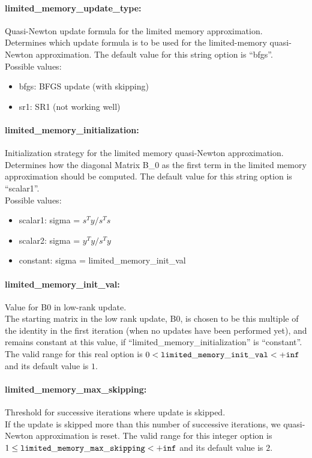 \paragraph{limited\_memory\_update\_type:} Quasi-Newton update formula for the limited memory approximation. $\;$ \\
 Determines which update formula is to be used for
the limited-memory quasi-Newton approximation.
The default value for this string option is ``bfgs''.
\\ 
Possible values:
\begin{itemize}
   \item bfgs: BFGS update (with skipping)
   \item sr1: SR1 (not working well)
\end{itemize}

\paragraph{limited\_memory\_initialization:} Initialization strategy for the limited memory quasi-Newton approximation. $\;$ \\
 Determines how the diagonal Matrix B\_0 as the
first term in the limited memory approximation
should be computed.
The default value for this string option is ``scalar1''.
\\ 
Possible values:
\begin{itemize}
   \item scalar1: sigma = $s^Ty/s^Ts$
   \item scalar2: sigma = $y^Ty/s^Ty$
   \item constant: sigma = limited\_memory\_init\_val
\end{itemize}

\paragraph{limited\_memory\_init\_val:} Value for B0 in low-rank update. $\;$ \\
 The starting matrix in the low rank update, B0,
is chosen to be this multiple of the identity in
the first iteration (when no updates have been
performed yet), and remains constant at this
value, if ``limited\_memory\_initialization'' is
``constant''. The valid range for this real option is 
$0 <  {\tt limited\_memory\_init\_val } <  {\tt +inf}$
and its default value is $1$.


\paragraph{limited\_memory\_max\_skipping:} Threshold for successive iterations where update is skipped. $\;$ \\
 If the update is skipped more than this number of
successive iterations, we quasi-Newton
approximation is reset. The valid range for this integer option is
$1 \le {\tt limited\_memory\_max\_skipping } <  {\tt +inf}$
and its default value is $2$.


